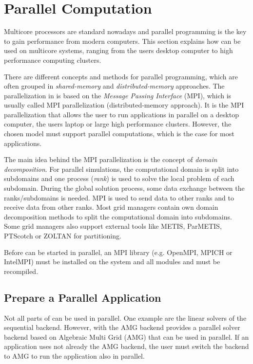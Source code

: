 \section{Parallel Computation}
\label{sec:parallelcomputation}
Multicore processors are standard nowadays and parallel programming is the key to gain
performance from modern computers. This section explains how \Dumux can be used 
on multicore systems, ranging from the users desktop computer to high performance
computing clusters.  

There are different concepts and methods for parallel programming, which are
often grouped in \textit{shared-memory} and \textit{distributed-memory}  
approaches. The parallelization in \Dumux is based on the 
\textit{Message Passing Interface} (MPI), which is usually called MPI parallelization (distributed-memory approach). 
It is the MPI parallelization that allows the user to run
\Dumux applications in parallel on a desktop computer, the users laptop or 
large high performance clusters. However, the chosen \Dumux 
model must support parallel computations, which is the case for most \Dumux applications.

The main idea behind the MPI parallelization is the concept of \textit{domain 
decomposition}. For parallel simulations, the computational domain is split into 
subdomains and one process (\textit{rank}) is used to solve the local problem of each 
subdomain. During the global solution process, some data exchange between the 
ranks/subdomains is needed. MPI is used to send data to other ranks and to receive 
data from other ranks. 
Most grid managers contain own domain decomposition methods to split the 
computational domain  into subdomains. Some grid managers also support external 
tools like METIS, ParMETIS, PTScotch or ZOLTAN for partitioning.

Before \Dumux can be started in parallel, an 
MPI library (e.g. OpenMPI, MPICH or IntelMPI) 
must be installed on the system and all \Dune modules and \Dumux must be recompiled.  


\subsection{Prepare a Parallel Application}
Not all parts of \Dumux can be used in parallel. One example are the linear solvers
of the sequential backend. However, with the AMG backend \Dumux provides 
a parallel solver backend based on Algebraic Multi Grid (AMG) that can be used in
parallel. 
If an application uses not already the AMG backend, the 
user must switch the backend to AMG to run the application also in parallel.

